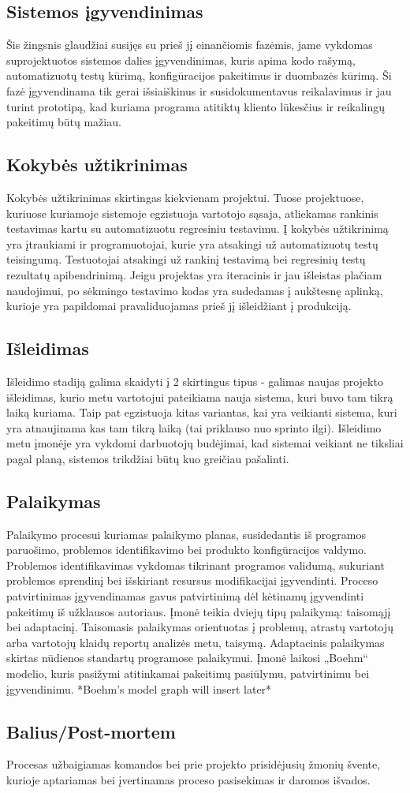 \documentclass{VUMIFPSkursinis}
\begin{document}
	\subsection{Sistemos įgyvendinimas}
	Šis žingsnis glaudžiai susijęs su prieš jį einančiomis fazėmis, jame vykdomas suprojektuotos sistemos dalies įgyvendinimas, kuris apima kodo rašymą, automatizuotų testų kūrimą, konfigūracijos pakeitimus ir duombazės kūrimą. Ši fazė įgyvendinama tik gerai išsiaiškinus ir susidokumentavus reikalavimus ir jau turint prototipą, kad kuriama programa atitiktų kliento lūkesčius ir reikalingų pakeitimų būtų mažiau.
	\subsection{Kokybės užtikrinimas}
	Kokybės užtikrinimas skirtingas kiekvienam projektui. Tuose projektuose, kuriuose kuriamoje sistemoje egzistuoja vartotojo sąsaja, atliekamas rankinis testavimas kartu su automatizuotu regresiniu testavimu. Į kokybės užtikrinimą yra įtraukiami ir programuotojai, kurie yra atsakingi už automatizuotų testų teisingumą. Testuotojai atsakingi už rankinį testavimą bei regresinių testų rezultatų apibendrinimą. Jeigu projektas yra iteracinis ir jau išleistas plačiam naudojimui, po sėkmingo testavimo kodas yra sudedamas į aukštesnę aplinką, kurioje yra papildomai pravaliduojamas prieš jį išleidžiant į produkciją.
	\subsection{Išleidimas}
	Išleidimo stadiją galima skaidyti į 2 skirtingus tipus - galimas naujas projekto išleidimas, kurio metu vartotojui pateikiama nauja sistema, kuri buvo tam tikrą laiką kuriama. Taip pat egzistuoja kitas variantas, kai yra veikianti sistema, kuri yra atnaujinama kas tam tikrą laiką (tai priklauso nuo sprinto ilgi). Išleidimo metu įmonėje yra vykdomi darbuotojų budėjimai, kad sistemai veikiant ne tiksliai pagal planą, sistemos trikdžiai būtų kuo greičiau pašalinti.
	\subsection{Palaikymas}
	Palaikymo procesui kuriamas palaikymo planas, susidedantis iš programos paruošimo, problemos identifikavimo bei produkto konfigūracijos valdymo. Problemos identifikavimas vykdomas tikrinant programos validumą, sukuriant problemos sprendinį bei išskiriant resursus modifikacijai įgyvendinti. Proceso patvirtinimas įgyvendinamas gavus patvirtinimą dėl kėtinamų įgyvendinti pakeitimų  iš užklausos autoriaus. Įmonė teikia dviejų tipų palaikymą: taisomąjį bei adaptacinį. Taisomasis palaikymas orientuotas į problemų, atrastų vartotojų arba vartotojų klaidų reportų analizės metu, taisymą. Adaptacinis palaikymas skirtas nūdienos standartų programose palaikymui. Įmonė laikosi „Boehm“ modelio, kuris pasižymi atitinkamai pakeitimų pasiūlymu, patvirtinimu bei įgyvendinimu. *Boehm's model graph will insert later* 

	\subsection{Balius/Post-mortem}
	Procesas užbaigiamas komandos bei prie projekto prisidėjusių žmonių švente, kurioje aptariamas bei įvertinamas proceso pasisekimas ir daromos išvados.

\end{document}
